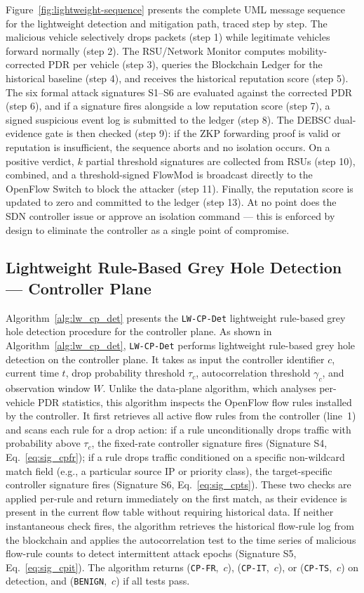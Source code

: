 \documentclass[12pt, a4paper]{report}
\begin{document}
Figure~\ref{fig:lightweight-sequence} presents the complete UML message sequence for the lightweight detection and mitigation path, traced step by step. The malicious vehicle selectively drops packets (step 1) while legitimate vehicles forward normally (step 2). The RSU/Network Monitor computes mobility-corrected PDR per vehicle (step 3), queries the Blockchain Ledger for the historical baseline (step 4), and receives the historical reputation score (step 5). The six formal attack signatures S1--S6 are evaluated against the corrected PDR (step 6), and if a signature fires alongside a low reputation score (step 7), a signed suspicious event log is submitted to the ledger (step 8). The DEBSC dual-evidence gate is then checked (step 9): if the ZKP forwarding proof is valid or reputation is insufficient, the sequence aborts and no isolation occurs. On a positive verdict, $k$ partial threshold signatures are collected from RSUs (step 10), combined, and a threshold-signed FlowMod is broadcast directly to the OpenFlow Switch to block the attacker (step 11). Finally, the reputation score is updated to zero and committed to the ledger (step 13). At no point does the SDN controller issue or approve an isolation command — this is enforced by design to eliminate the controller as a single point of compromise.

\subsection{Lightweight Rule-Based Grey Hole Detection — Controller Plane}

Algorithm~\ref{alg:lw_cp_det} presents the \texttt{LW-CP-Det} lightweight rule-based grey hole detection procedure for the controller plane. As shown in Algorithm~\ref{alg:lw_cp_det},
\texttt{LW-CP-Det} performs lightweight rule-based grey hole
detection on the controller plane. It takes as input the
controller identifier $c$, current time $t$, drop probability threshold
$\tau_c$, autocorrelation threshold $\gamma_c$, and observation window $W$.
Unlike the data-plane algorithm, which analyses per-vehicle PDR statistics,
this algorithm inspects the OpenFlow flow rules installed by the controller.
It first retrieves all active flow rules from the controller (line~1) and
scans each rule for a drop action: if a rule unconditionally drops traffic
with probability above $\tau_c$, the fixed-rate controller signature fires
(Signature S4, Eq.~\eqref{eq:sig_cpfr}); if a rule drops traffic conditioned
on a specific non-wildcard match field (e.g., a particular source IP or
priority class), the target-specific controller signature fires (Signature S6,
Eq.~\eqref{eq:sig_cpts}). These two checks are applied per-rule and return
immediately on the first match, as their evidence is present in the current
flow table without requiring historical data. If neither instantaneous check
fires, the algorithm retrieves the historical flow-rule log from the blockchain
and applies the autocorrelation test to the time series of malicious flow-rule
counts to detect intermittent attack epochs (Signature S5,
Eq.~\eqref{eq:sig_cpit}). The algorithm returns (\texttt{CP-FR},~$c$),
(\texttt{CP-IT},~$c$), or (\texttt{CP-TS},~$c$) on detection, and
(\texttt{BENIGN},~$c$) if all tests pass.
\end{document}
